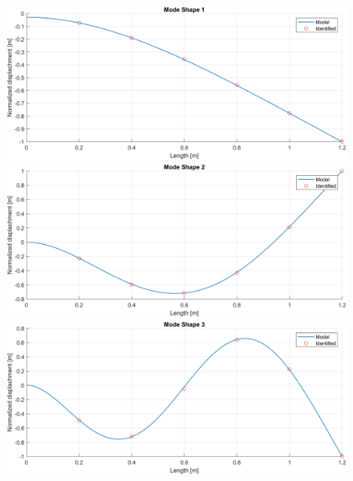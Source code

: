 \begin{figure}[H]
    \begin{minipage}[b]{0.45\textwidth}
        \centering
        \includegraphics[width=\textwidth]{img/MATLAB/Part_A/Comparison_ModeShape_01.png}
    \end{minipage}
    \hfill
    \begin{minipage}[b]{0.45\textwidth}
        \centering
        \includegraphics[width=\textwidth]{img/MATLAB/Part_A/Comparison_ModeShape_02.png}
    \end{minipage}
    \begin{minipage}[b]{0.45\textwidth}
        \centering
        \includegraphics[width=\textwidth]{img/MATLAB/Part_A/Comparison_ModeShape_03.png}
    \end{minipage}
    \hfill

\end{figure}
